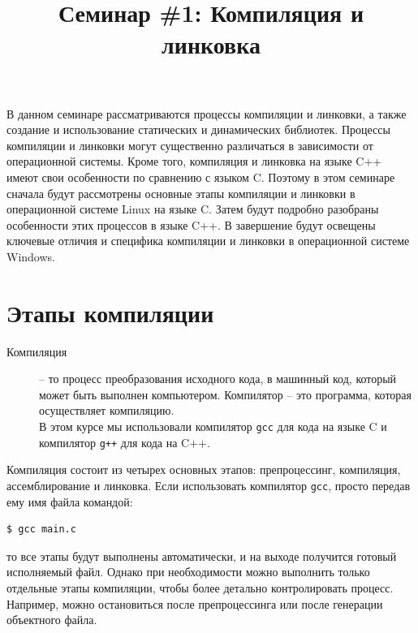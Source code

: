 \documentclass{article}
\begin{document}
\title{Семинар \#1: Компиляция и линковка \vspace{-5ex}}\date{}\maketitle

В данном семинаре рассматриваются процессы компиляции и линковки, а также создание и использование статических и динамических библиотек. Процессы компиляции и линковки могут существенно различаться в зависимости от операционной системы. Кроме того, компиляция и линковка на языке C++ имеют свои особенности по сравнению с языком C.
Поэтому в этом семинаре сначала будут рассмотрены основные этапы компиляции и линковки в операционной системе Linux на языке C. Затем будут подробно разобраны особенности этих процессов в языке C++. В завершение будут освещены ключевые отличия и специфика компиляции и линковки в операционной системе Windows.

\section{Этапы компиляции}
\begin{description}
\item[Компиляция] -- то процесс преобразования исходного кода, в машинный код, который может быть выполнен компьютером. Компилятор -- это программа, которая осуществляет компиляцию. \\
В этом курсе мы использовали компилятор \texttt{gcc} для кода на языке C и компилятор \texttt{g++} для кода на C++.
\end{description}


\noindent Компиляция состоит из четырех основных этапов: препроцессинг, компиляция, ассемблирование и линковка. Если использовать компилятор \texttt{gcc}, просто передав ему имя файла командой:
\begin{lstlisting}[style=csMiptBash]
$ gcc main.c
\end{lstlisting}
то все этапы будут выполнены автоматически, и на выходе получится готовый исполняемый файл. Однако при необходимости можно выполнить только отдельные этапы компиляции, чтобы более детально контролировать процесс. Например, можно остановиться после препроцессинга или после генерации объектного файла.
\end{document}
